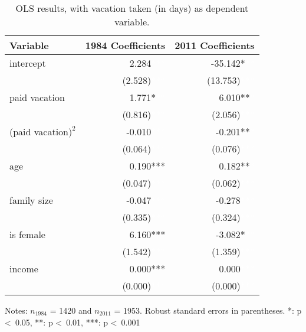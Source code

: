 \documentclass{article}
\begin{document}
    \setlength{\extrarowheight}{3pt}
    \begin{table}[h]
    \centering
    \hspace*{-1.5cm}
    \begin{tabular}{l|r|r}
    Variable            &             1984 Coefficients &              2011 Coefficients \\ \hline \hline
    intercept           &   2.284\textcolor{white}{***} &  -35.142*\textcolor{white}{**} \\
                        & (2.528)\textcolor{white}{***} & (13.753)\textcolor{white}{***} \\ \hline
    paid vacation       &   1.771*\textcolor{white}{**} &    6.010**\textcolor{white}{*} \\
                        & (0.816)\textcolor{white}{***} &  (2.056)\textcolor{white}{***} \\ \hline
    (paid vacation$)^2$ &  -0.010\textcolor{white}{***} &   -0.201**\textcolor{white}{*} \\
                        & (0.064)\textcolor{white}{***} &  (0.076)\textcolor{white}{***} \\ \hline
    age                 &   0.190***\textcolor{white}{} &    0.182**\textcolor{white}{*} \\
                        & (0.047)\textcolor{white}{***} &  (0.062)\textcolor{white}{***} \\ \hline
    family size         &  -0.047\textcolor{white}{***} &   -0.278\textcolor{white}{***} \\
                        & (0.335)\textcolor{white}{***} &  (0.324)\textcolor{white}{***} \\ \hline
    is female           &   6.160***\textcolor{white}{} &   -3.082*\textcolor{white}{**} \\
                        & (1.542)\textcolor{white}{***} &  (1.359)\textcolor{white}{***} \\ \hline
    income              &   0.000***\textcolor{white}{} &    0.000\textcolor{white}{***} \\
                        & (0.000)\textcolor{white}{***} &  (0.000)\textcolor{white}{***}
    \end{tabular}
    \hspace*{-1.5cm}
    \caption{OLS results, with vacation taken (in days) as dependent variable.}
    \label{ols}
      Notes: $n_{1984}$ = 1420 and $n_{2011}$ = 1953.
      Robust standard errors in parentheses.
      *: p \textless\ 0.05, **: p \textless\ 0.01, ***: p \textless\ 0.001
    \end{table}
\end{document}
